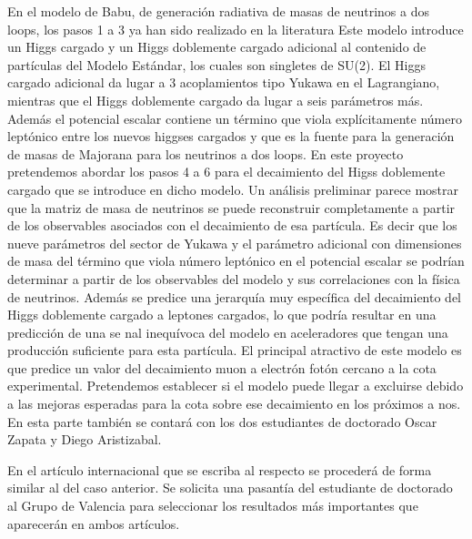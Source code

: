 \begin{ideas}
En el modelo de Babu, de generación radiativa de masas de neutrinos a
dos loops, los pasos 1 a 3 ya han sido realizado en la
literatura %
Este modelo introduce un Higgs cargado
y un Higgs doblemente cargado adicional al contenido de partículas del
Modelo Estándar, los cuales son singletes de SU(2). El Higgs cargado
adicional da lugar a 3 acoplamientos tipo Yukawa en el Lagrangiano,
mientras que el Higgs doblemente cargado da lugar a seis parámetros
más. Además el potencial escalar contiene un término que viola
explícitamente número leptónico entre los nuevos higgses cargados y
que es la fuente para la generación de masas de Majorana para los
neutrinos a dos loops. En este proyecto pretendemos abordar los pasos
4 a 6 para el decaimiento del Higss doblemente cargado que se
introduce en dicho modelo. Un análisis preliminar parece mostrar que
la matriz de masa de neutrinos se puede reconstruir completamente a
partir de los observables asociados con el decaimiento de esa
partícula. Es decir que los nueve parámetros del sector de Yukawa y el
parámetro adicional con dimensiones de masa del término que viola
número leptónico en el potencial escalar se podrían determinar a
partir de los observables del modelo y sus correlaciones con la física
de neutrinos. Además se predice una jerarquía muy específica del
decaimiento del Higgs doblemente cargado a leptones cargados, lo que
podría resultar en una predicción de una se nal inequívoca del modelo
en aceleradores que tengan una producción suficiente para esta
partícula. El principal atractivo de este modelo es que predice un
valor del decaimiento muon a electrón fotón cercano a la cota
experimental. Pretendemos establecer si el modelo puede llegar a
excluirse debido a las mejoras esperadas para la cota sobre ese
decaimiento en los próximos a nos. En esta parte también se contará con
los dos estudiantes de doctorado Oscar Zapata y Diego Aristizabal.

En el artículo internacional que se escriba al respecto se procederá
de forma similar al del caso anterior. Se solicita una pasantía del
estudiante de doctorado al Grupo de Valencia para seleccionar los
resultados más importantes que aparecerán en ambos artículos.


\end{ideas}
